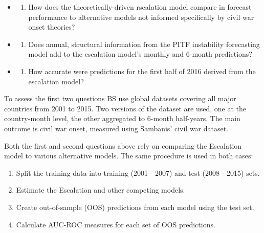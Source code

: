 \documentclass[]{article}
\providecommand{\tightlist}{%
  \setlength{\itemsep}{0pt}\setlength{\parskip}{0pt}}
\begin{document}
\begin{itemize}
\item
  \begin{enumerate}
  \def\labelenumi{(\arabic{enumi})}
  \tightlist
  \item
    How does the theoretically-driven rscalation model compare in
    forecast performance to alternative models not informed specifically
    by civil war onset theories?
  \end{enumerate}
\item
  \begin{enumerate}
  \def\labelenumi{(\arabic{enumi})}
  \setcounter{enumi}{1}
  \tightlist
  \item
    Does annual, structural information from the PITF instability
    forecasting model add to the escalation model's monthly and 6-month
    predictions?
  \end{enumerate}
\item
  \begin{enumerate}
  \def\labelenumi{(\arabic{enumi})}
  \setcounter{enumi}{2}
  \tightlist
  \item
    How accurate were predictions for the first half of 2016 derived
    from the escalation model?
  \end{enumerate}
\end{itemize}

To assess the first two questions BS use global datasets covering all
major countries from 2001 to 2015. Two versions of the dataset are used,
one at the country-month level, the other aggregated to 6-month
half-years. The main outcome is civil war onset, measured using
Sambanis' civil war dataset.

Both the first and second questions above rely on comparing the
Escalation model to various alternative models. The same procedure is
used in both cases:

\begin{enumerate}
\def\labelenumi{\arabic{enumi}.}
\tightlist
\item
  Split the training data into training (2001 - 2007) and test (2008 -
  2015) sets.
\item
  Estimate the Escalation and other competing models.
\item
  Create out-of-sample (OOS) predictions from each model using the test
  set.
\item
  Calculate AUC-ROC measures for each set of OOS predictions.
\end{enumerate}
\end{document}
